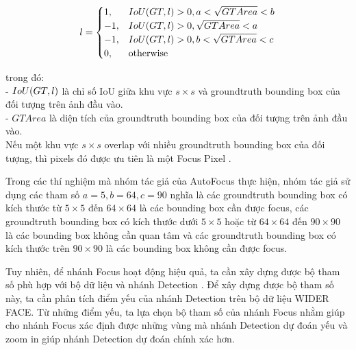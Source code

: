 {    \[l = 
        \begin{cases}
            1, & IoU \index{IoU}(GT, l) > 0, a < \sqrt{GTArea} < b \\
            -1, & IoU \index{IoU}(GT, l) > 0, \sqrt{GTArea} < a  \\
            -1, & IoU \index{IoU}(GT, l) > 0, b < \sqrt{GTArea} < c  \\
            0, & \text{otherwise}
        \end{cases}
    \]

    \noindent
    trong đó: \\
    - $IoU \index{IoU}(GT, l)$ là chỉ số IoU  giữa khu vực $s \times s$ và groundtruth  bounding box  của đối tượng trên ảnh đầu vào. \\
    - $GTArea$ là diện tích của groundtruth  bounding box  của đối tượng trên ảnh đầu vào. \\
    Nếu một khu vực $s \times s$ overlap với nhiều groundtruth  bounding box  của đối tượng, thì pixels  đó được ưu tiên là một Focus Pixel .

    \noindent
    Trong các thí nghiệm mà nhóm tác giả của AutoFocus \cite{najibi2019autofocus} thực hiện, nhóm tác giả sử dụng các tham số $a = 5, b = 64, c = 90$ nghĩa là các groundtruth  bounding box  có kích thước từ $5 \times 5$ đến $64 \times 64$ là các bounding box  cần được focus, các groundtruth  bounding box  có kích thước dưới $5 \times 5$ hoặc từ $64 \times 64$ đến $90 \times 90$ là các bounding box  không cần quan tâm và các groundtruth  bounding box  có kích thước trên $90 \times 90$ là các bounding box  không cần được focus.

    \noindent
    Tuy nhiên, để nhánh Focus hoạt động hiệu quả, ta cần xây dựng được bộ tham số phù hợp với bộ dữ liệu và nhánh Detection .
    Để xây dựng được bộ tham số này, ta cần phân tích điểm yếu của nhánh Detection  trên bộ dữ liệu WIDER FACE.
    Từ những điểm yếu, ta lựa chọn bộ tham số của nhánh Focus  nhằm giúp cho nhánh Focus  xác định được những vùng mà nhánh Detection  dự đoán yếu và zoom in giúp nhánh Detection  dự đoán chính xác hơn.

}
